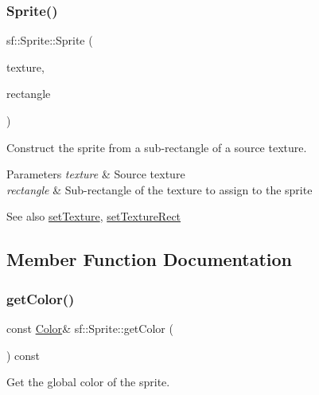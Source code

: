 \subsubsection{\texorpdfstring{Sprite()}{Sprite()}\hspace{0.1cm}{\footnotesize\ttfamily [3/3]}}
{\footnotesize\ttfamily sf\+::\+Sprite\+::\+Sprite (\begin{DoxyParamCaption}\item[{const \hyperlink{classsf_1_1_texture}{Texture} \&}]{texture,  }\item[{const \hyperlink{classsf_1_1_rect}{Int\+Rect} \&}]{rectangle }\end{DoxyParamCaption})}



Construct the sprite from a sub-\/rectangle of a source texture. 


\begin{DoxyParams}{Parameters}
{\em texture} & Source texture \\
\hline
{\em rectangle} & Sub-\/rectangle of the texture to assign to the sprite\\
\hline
\end{DoxyParams}
\begin{DoxySeeAlso}{See also}
\hyperlink{classsf_1_1_sprite_a3729c88d88ac38c19317c18e87242560}{set\+Texture}, \hyperlink{classsf_1_1_sprite_a3fefec419a4e6a90c0fd54c793d82ec2}{set\+Texture\+Rect} 
\end{DoxySeeAlso}


\subsection{Member Function Documentation}
\mbox{\label{classsf_1_1_sprite_ac5f419f37b4e38f7a94186e3a3e303e1}} 
\subsubsection{\texorpdfstring{get\+Color()}{getColor()}}
{\footnotesize\ttfamily const \hyperlink{classsf_1_1_color}{Color}\& sf\+::\+Sprite\+::get\+Color (\begin{DoxyParamCaption}{ }\end{DoxyParamCaption}) const}



Get the global color of the sprite. 

